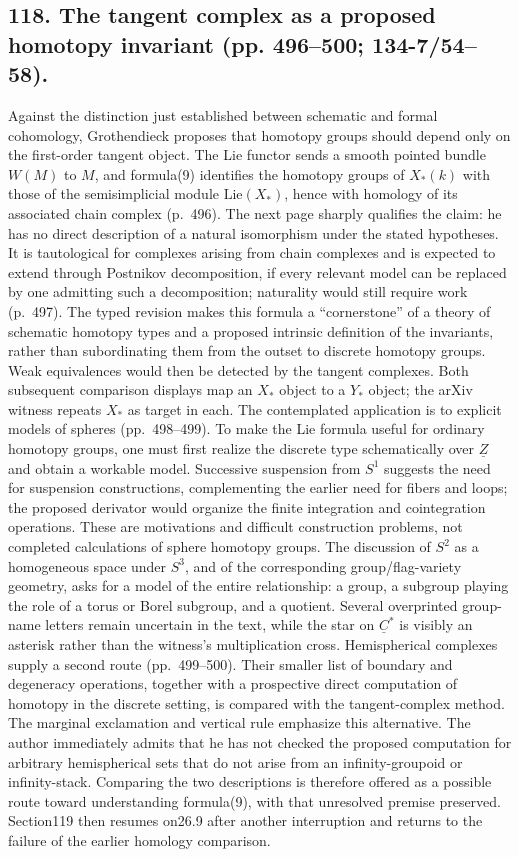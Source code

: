 \documentclass[10pt,oneside]{book}
\begin{document}
\subsection*{118. The tangent complex as a proposed homotopy invariant (pp. 496--500; 134-7/54--58).}
Against the distinction just established between schematic and formal cohomology, Grothendieck proposes that homotopy groups should depend only on the first-order tangent object. The Lie functor sends a smooth pointed bundle $W(M)$ to $M$, and formula(9) identifies the homotopy groups of $X_*(k)$ with those of the semisimplicial module $\mathrm{Lie}(X_*)$, hence with homology of its associated chain complex (p.~496). The next page sharply qualifies the claim: he has no direct description of a natural isomorphism under the stated hypotheses. It is tautological for complexes arising from chain complexes and is expected to extend through Postnikov decomposition, if every relevant model can be replaced by one admitting such a decomposition; naturality would still require work (p.~497). The typed revision makes this formula a ``cornerstone'' of a theory of schematic homotopy types and a proposed intrinsic definition of the invariants, rather than subordinating them from the outset to discrete homotopy groups. Weak equivalences would then be detected by the tangent complexes. Both subsequent comparison displays map an $X_*$ object to a $Y_*$ object; the arXiv witness repeats $X_*$ as target in each. The contemplated application is to explicit models of spheres (pp.~498--499). To make the Lie formula useful for ordinary homotopy groups, one must first realize the discrete type schematically over $\underline Z$ and obtain a workable model. Successive suspension from $S^1$ suggests the need for suspension constructions, complementing the earlier need for fibers and loops; the proposed derivator would organize the finite integration and cointegration operations. These are motivations and difficult construction problems, not completed calculations of sphere homotopy groups. The discussion of $S^2$ as a homogeneous space under $S^3$, and of the corresponding group/flag-variety geometry, asks for a model of the entire relationship: a group, a subgroup playing the role of a torus or Borel subgroup, and a quotient. Several overprinted group-name letters remain uncertain in the text, while the star on $\underline C^*$ is visibly an asterisk rather than the witness's multiplication cross. Hemispherical complexes supply a second route (pp.~499--500). Their smaller list of boundary and degeneracy operations, together with a prospective direct computation of homotopy in the discrete setting, is compared with the tangent-complex method. The marginal exclamation and vertical rule emphasize this alternative. The author immediately admits that he has not checked the proposed computation for arbitrary hemispherical sets that do not arise from an infinity-groupoid or infinity-stack. Comparing the two descriptions is therefore offered as a possible route toward understanding formula(9), with that unresolved premise preserved. Section119 then resumes on26.9 after another interruption and returns to the failure of the earlier homology comparison.
\end{document}
